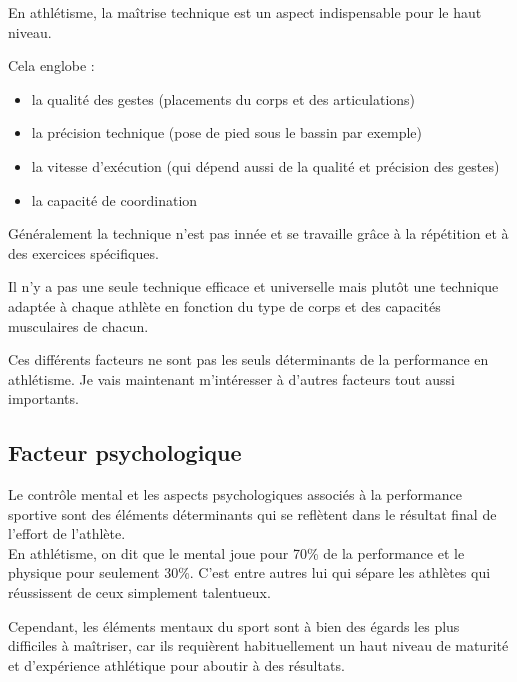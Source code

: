         En athlétisme, la maîtrise technique est un aspect indispensable pour le haut niveau.
        
        Cela englobe :
        \begin{itemize}
            \item la qualité des gestes (placements du corps et des articulations)
            \item la précision technique (pose de pied sous le bassin par exemple)
            \item la vitesse d’exécution (qui dépend aussi de la qualité et précision des gestes)
            \item la capacité de coordination
        \end{itemize}
        
        Généralement la technique n'est pas innée et se travaille grâce à la répétition et à des exercices spécifiques.
        
        Il n'y a pas une seule technique efficace et universelle mais plutôt une technique adaptée à chaque athlète en fonction du type de corps et des capacités musculaires de chacun.
        
    
        Ces différents facteurs ne sont pas les seuls déterminants de la performance en athlétisme. Je vais maintenant m'intéresser à d'autres facteurs tout aussi importants.\\
        
        \vspace{10pt}
            
                
        \subsection{Facteur psychologique}

            Le contrôle mental et les aspects psychologiques associés à la performance sportive sont des éléments déterminants qui se reflètent dans le résultat final de l'effort de l'athlète.\\
            
            En athlétisme, on dit que le mental joue pour 70\% de la performance et le physique pour seulement 30\%. C'est entre autres lui qui sépare les athlètes qui réussissent de ceux simplement talentueux.
            
            Cependant, les éléments mentaux du sport sont à bien des égards les plus difficiles à maîtriser, car ils requièrent habituellement un haut niveau de maturité et d'expérience athlétique pour aboutir à des résultats.\\
            
